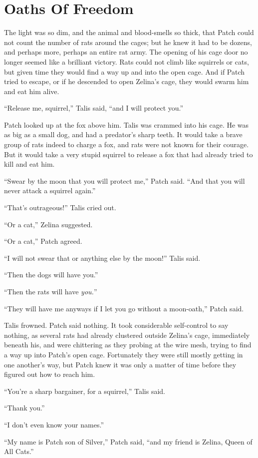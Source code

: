 \documentclass[ebook,oneside,openany,17pt]{memoir}
\renewcommand{\thechapter}{\Roman{chapter}}
\newcounter{sections}
\newcommand{\sections}[1]{%
  \section*{#1}
  \addtocounter{sections}{1}%
  \pdfbookmark[1]{#1}{section.\thechapter.\thesections}}
\begin{document}

\sections{Oaths Of Freedom}

The light was so dim, and the animal and blood-smells so thick, that
Patch could not count the number of rats around the cages; but he knew
it had to be dozens, and perhaps more, perhaps an entire rat army. The
opening of his cage door no longer seemed like a brilliant
victory. Rats could not climb like squirrels or cats, but given time
they would find a way up and into the open cage. And if Patch tried to
escape, or if he descended to open Zelina’s cage, they would swarm him
and eat him alive.

“Release me, squirrel,” Talis said, “and I will protect you.”

Patch looked up at the fox above him. Talis was crammed into his
cage. He was as big as a small dog, and had a predator’s sharp
teeth. It would take a brave group of rats indeed to charge a fox, and
rats were not known for their courage. But it would take a very stupid
squirrel to release a fox that had already tried to kill and eat him.

“Swear by the moon that you will protect me,” Patch said. “And that
you will never attack a squirrel again.”

“That’s outrageous!” Talis cried out.

“Or a cat,” Zelina suggested.

“Or a cat,” Patch agreed.

“I will not swear that or anything else by the moon!” Talis said.

“Then the dogs will have you.”

“Then the rats will have \emph{you.}”

“They will have me anyways if I let you go without a moon-oath,” Patch
said.

Talis frowned. Patch said nothing. It took considerable self-control
to say nothing, as several rats had already clustered outside Zelina’s
cage, immediately beneath his, and were chittering as they probing at
the wire mesh, trying to find a way up into Patch’s open
cage. Fortunately they were still mostly getting in one another’s way,
but Patch knew it was only a matter of time before they figured out
how to reach him.

“You’re a sharp bargainer, for a squirrel,” Talis said.

“Thank you.”

“I don’t even know your names.”

“My name is Patch son of Silver,” Patch said, “and my friend is
Zelina, Queen of All Cats.”
\end{document}
